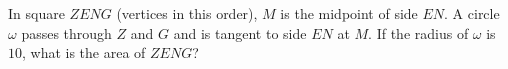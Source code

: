 In square $ZENG$ (vertices in this order), $M$ is the midpoint of side $EN$. A circle $\omega$ passes through $Z$ and $G$ and is tangent to side $EN$ at $M$. If the radius of $\omega$ is $10$, what is the area of $ZENG$?
